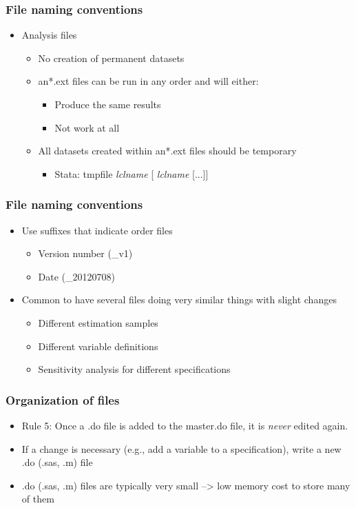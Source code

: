 \documentclass[english,xcolor=dvipsnames]{beamer}
\newcommand{\bi}{\begin{itemize}}
\newcommand{\ei}{\end{itemize}}
\begin{document}
\begin{frame}
\frametitle{File naming conventions}

   \bi 
   \item Analysis files
      \bi 
      \item No creation of permanent datasets
      \item an*.ext files can be run in any order and will either:
         \bi 
         \item Produce the same results
         \item Not work at all
         \ei
      \item All datasets created within an*.ext files should be temporary
         \bi 
         \item Stata: tmpfile  \emph{lclname} [ \emph{lclname} [...]]
         \ei
      \ei
   \ei
\end{frame}

\begin{frame}
\frametitle{File naming conventions}

   \bi 
   \item Use suffixes that indicate order files
      \bi 
      \item Version number (\_v1)
      \item Date (\_20120708)
      \ei
   \item Common to have several files doing very similar things with slight changes
      \bi 
      \item Different estimation samples
      \item Different variable definitions
      \item Sensitivity analysis for different specifications
      \ei
   \ei
\end{frame}

\begin{frame}
\frametitle{Organization of files}

   \bi 
   \item Rule 5: Once a .do file is added to the master.do file, it is  \emph{never} edited again.
   \item If a change is necessary (e.g., add a variable to a specification), write a new .do (.sas, .m) file
   \item .do (.sas, .m) files are typically very small --> low memory cost to store many of them
   \ei
\end{frame}
\end{document}
